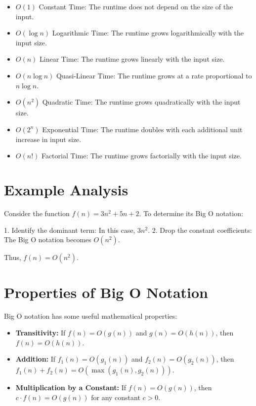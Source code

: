 \documentclass[10pt]{article}
\theoremstyle{plain}
\theoremstyle{definition}
\theoremstyle{remark}
\begin{document}
\begin{itemize}
    \item \( O(1) \) Constant Time: The runtime does not depend on the size of the input.
    \item \( O(\log n) \) Logarithmic Time: The runtime grows logarithmically with the input size.
    \item \( O(n) \) Linear Time: The runtime grows linearly with the input size.
    \item \( O(n \log n) \) Quasi-Linear Time: The runtime grows at a rate proportional to \( n \log n \).
    \item \( O(n^2) \) Quadratic Time: The runtime grows quadratically with the input size.
    \item \( O(2^n) \) Exponential Time: The runtime doubles with each additional unit increase in input size.
    \item \( O(n!) \) Factorial Time: The runtime grows factorially with the input size.
\end{itemize}

\section*{Example Analysis}

Consider the function \( f(n) = 3n^2 + 5n + 2 \). To determine its Big O notation:

1. Identify the dominant term: In this case, \( 3n^2 \).
2. Drop the constant coefficients: The Big O notation becomes \( O(n^2) \).

Thus, \( f(n) = O(n^2) \).

\section*{Properties of Big O Notation}

Big O notation has some useful mathematical properties:
\begin{itemize}
    \item \textbf{Transitivity:} If \( f(n) = O(g(n)) \) and \( g(n) = O(h(n)) \), then \( f(n) = O(h(n)) \).
    \item \textbf{Addition:} If \( f_1(n) = O(g_1(n)) \) and \( f_2(n) = O(g_2(n)) \), then \( f_1(n) + f_2(n) = O(\max(g_1(n), g_2(n))) \).
    \item \textbf{Multiplication by a Constant:} If \( f(n) = O(g(n)) \), then \( c \cdot f(n) = O(g(n)) \) for any constant \( c > 0 \).
\end{itemize}
\end{document}
